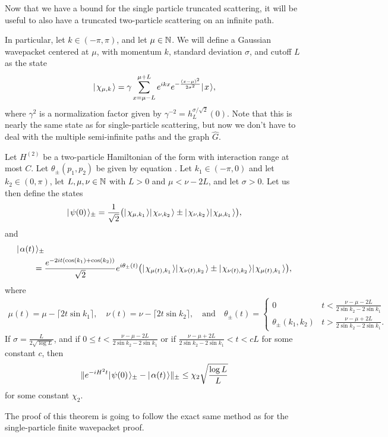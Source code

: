 \documentclass[../thesis-main/thesis-main]{subfiles}
\begin{document}
Now that we have a bound for the single particle truncated scattering, it will be useful to also have a truncated two-particle scattering on an infinite path.

In particular, let $k\in(-\pi,\pi)$, and let $\mu \in \mathbb{N}$.  We will define a Gaussian wavepacket centered at $\mu$, with momentum $k$, standard deviation $\sigma$, and cutoff $L$ as the state
\begin{align}
  |\mspace{2mu} \chi_{\mu,k} \mspace{2mu} \rangle = \gamma \sum_{x=\mu-L}^{\mu+L} e^{i k x} e^{ -\frac{(x-\mu)^2}{2\sigma^2}} |\mspace{2mu} x \mspace{2mu} \rangle,
\end{align}
where $\gamma^2$ is a normalization factor given by $\gamma^{-2} = h_L^{\sigma/\sqrt{2}}(0)$.  Note that this is nearly the same state as for single-particle scattering, but now we don't have to deal with the multiple semi-infinite paths and the graph $\widehat{G}$.
\begin{theorem}
Let $H^{(2)}$ be a two-particle Hamiltonian of the form  with interaction range at most $C$.  Let $\theta_{\pm}(p_1,p_2)$ be given by equation .  Let $k_1\in (-\pi,0)$ and let $k_2 \in (0,\pi)$, let $L,\mu, \nu \in \mathbb{N}$ with $L>0$ and $\mu < \nu - 2 L$, and let $\sigma > 0$.  Let us then define the states
\begin{align}
  |\mspace{2mu} \psi(0) \mspace{2mu} \rangle_{\pm} = \frac{1}{\sqrt{2}} \big( |\mspace{2mu} \chi_{\mu, k_1} \mspace{2mu} \rangle |\mspace{2mu} \chi_{\nu, k_2} \mspace{2mu} \rangle \pm  |\mspace{2mu} \chi_{\nu,k_2} \mspace{2mu} \rangle|\mspace{2mu} \chi_{\mu,k_1} \mspace{2mu} \rangle\big),
\end{align}
and 
\begin{align}
  &|\mspace{2mu} \alpha (t) \mspace{2mu} \rangle_{\pm} \nonumber\\
  &\qquad= \frac{e^{-2 i t (\cos(k_1) + \cos(k_2))}}{\sqrt{2}} 
    e^{i \theta_{\pm}(t)} \big( |\mspace{2mu} \chi_{\mu(t),k_1} \mspace{2mu} \rangle|\mspace{2mu} \chi_{\nu(t),k_2} \mspace{2mu} \rangle  \pm |\mspace{2mu} \chi_{\nu(t),k_2} \mspace{2mu} \rangle|\mspace{2mu} \chi_{\mu(t),k_1} \mspace{2mu} \rangle\big) ,
\end{align}
where
\begin{align}
  \mu(t) = \mu - \lceil 2 t \sin k_1\rceil, \quad
  \nu(t) = \nu - \lceil 2 t \sin k_2\rceil, \quad \text{and} \quad 
  \theta_{\pm}(t)=\begin{cases}0 & t < \frac{ \nu - \mu - 2 L}{2 \sin k_2 - 2\sin k_1}\\
  \theta_{\pm}(k_1,k_2)& t > \frac{\nu - \mu + 2 L}{2 \sin k_2 - 2 \sin k_1}.\end{cases}
\end{align}
If $\sigma = \frac{ L}{2\sqrt{\log L}}$, and if $0 \leq t < \frac{ \nu - \mu - 2 L}{2 \sin k_2 - 2\sin k_1}$ or if $\frac{\nu - \mu + 2L}{2 \sin k_2 - 2\sin k_1}< t < c L$ for some constant $c$, then 
\begin{align}
  \|{e^{ - i H^2 t} |\mspace{2mu} \psi(0) \mspace{2mu} \rangle_{\pm} - |\mspace{2mu} \alpha(t) \mspace{2mu} \rangle}\|_{\pm} \leq \chi_2 \sqrt{\frac{\log L}{L}}
\end{align}
for some constant $\chi_2$.
\end{theorem}
The proof of this theorem is going to follow the exact same method as for the single-particle finite wavepacket proof.
\end{document}
